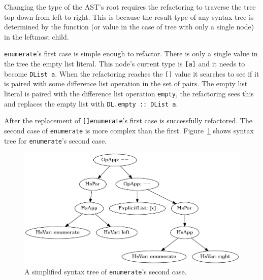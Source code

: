Changing the type of the AST's root requires the refactoring to traverse the tree top down from left to right. This is because the result type of any syntax tree is determined by the function (or value in the case of tree with only a single node) in the leftmost child. 

\texttt{enumerate}'s first case is simple enough to refactor. There is only a single value in the tree the empty list literal. This node's current type is \texttt{[a]} and it needs to become \texttt{DList a}. When the refactoring reaches the \texttt{[]} value it searches to see if it is paired with some difference list operation in the set of pairs. The empty list literal is paired with the difference list operation \texttt{empty}, the refactoring sees this and replaces the empty list with \texttt{DL.empty :: DList a}.

After the replacement of \texttt{[]}\DIFaddbegin \DIFadd{, }\DIFaddend \texttt{enumerate}'s first case is successfully refactored. The second case of \texttt{enumerate} is more complex than the first. Figure~\ref{enumAST} shows \DIFdelbegin {}\DIFdelend \DIFaddbegin {}\DIFaddend syntax tree for \texttt{enumerate}'s second case. 

\begin{figure}[h]
	\begin{center}
		\includegraphics[scale=.5]{graphVis/Chapter3/enumerate.png}
	\end{center}
	\caption{A simplified syntax tree of \texttt{enumerate}'s second case.}
	\label{enumAST}
\end{figure}

